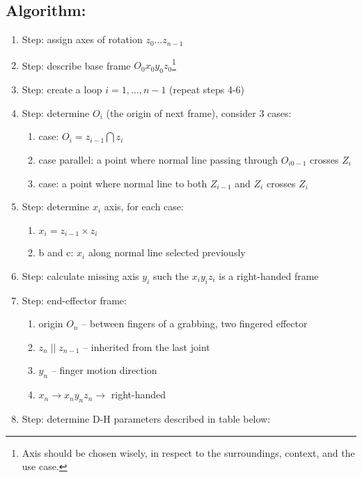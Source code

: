 \documentclass[12pt, a4paper]{extarticle}
\begin{document}
	\subsection{Algorithm:}
	\begin{enumerate}
		\setlength\itemsep{-0.3em}
		\item Step: assign axes of rotation $z_0 \dots z_{n-1}$
		\item Step: describe base frame $O_0 x_0 y_0 z_0$\footnote{Axis should be chosen wisely, in respect to the surroundings, context, and the use case.}
		\item Step: create a loop $i=1, \dots, n-1$ (repeat steps 4-6)
		\item Step: determine $O_i$ (the origin of next frame), consider 3 cases:
		\begin{enumerate}
			\item case: $O_i = z_{i-1}  \bigcap z_i$
			\item case parallel: a point where normal line passing through $O_{i0-1}$ crosses $Z_i$
			\item case: a point where normal line to both $Z_{i-1}$ and $Z_i$ crosses $Z_i$
		\end{enumerate}
		\item Step: determine $x_i$ axis, for each case:
		\begin{enumerate}
			\item $x_i = z_{i-1} \times z_i$
			\item b and c: $x_i$ along normal line selected previously
		\end{enumerate}
		\item Step: calculate missing axis $y_i$ such the $x_i y_i z_i$ is a right-handed frame
		\item Step: end-effector frame:
		\begin{enumerate}
			\item origin $O_n$ -- between fingers of a grabbing, two fingered effector
			\item $z_n \; || \; z_{n-1}$ -- inherited from the last joint
			\item $y_n$ -- finger motion direction
			\item $x_n \rightarrow x_n y_n z_n \rightarrow $ right-handed
		\end{enumerate}
		\item Step: determine D-H parameters described in table below:


\end{enumerate}
\end{document}
